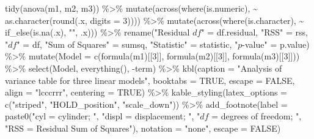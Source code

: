 \documentclass[
  11pt,
  a4paper,
  twoside]{scrbook}
\newenvironment{Shaded}{\begin{snugshade}}{\end{snugshade}}
\newcommand{\AttributeTok}[1]{\textcolor[rgb]{0.77,0.63,0.00}{#1}}
\newcommand{\ConstantTok}[1]{\textcolor[rgb]{0.00,0.00,0.00}{#1}}
\newcommand{\DecValTok}[1]{\textcolor[rgb]{0.00,0.00,0.81}{#1}}
\newcommand{\FunctionTok}[1]{\textcolor[rgb]{0.00,0.00,0.00}{#1}}
\newcommand{\NormalTok}[1]{#1}
\newcommand{\OtherTok}[1]{\textcolor[rgb]{0.56,0.35,0.01}{#1}}
\newcommand{\SpecialCharTok}[1]{\textcolor[rgb]{0.00,0.00,0.00}{#1}}
\newcommand{\StringTok}[1]{\textcolor[rgb]{0.31,0.60,0.02}{#1}}
\begin{document}
\begin{Shaded}
\begin{Highlighting}[]
\FunctionTok{tidy}\NormalTok{(}\FunctionTok{anova}\NormalTok{(m1, m2, m3)) }\SpecialCharTok{\%\textgreater{}\%} 
    \FunctionTok{mutate}\NormalTok{(}\FunctionTok{across}\NormalTok{(}\FunctionTok{where}\NormalTok{(is.numeric), }\SpecialCharTok{\textasciitilde{}} \FunctionTok{as.character}\NormalTok{(}\FunctionTok{round}\NormalTok{(.x, }\AttributeTok{digits =} \DecValTok{3}\NormalTok{)))) }\SpecialCharTok{\%\textgreater{}\%} 
    \FunctionTok{mutate}\NormalTok{(}\FunctionTok{across}\NormalTok{(}\FunctionTok{where}\NormalTok{(is.character), }\SpecialCharTok{\textasciitilde{}} \FunctionTok{if\_else}\NormalTok{(}\FunctionTok{is.na}\NormalTok{(.x), }\StringTok{""}\NormalTok{, .x))) }\SpecialCharTok{\%\textgreater{}\%} 
    \FunctionTok{rename}\NormalTok{(}\StringTok{"Residual $df$"} \OtherTok{=} \StringTok{\textasciigrave{}}\AttributeTok{df.residual}\StringTok{\textasciigrave{}}\NormalTok{,}
           \StringTok{"RSS"} \OtherTok{=}\NormalTok{ rss,}
           \StringTok{"$df$"} \OtherTok{=}\NormalTok{ df,}
           \StringTok{"Sum of Squares"} \OtherTok{=}\NormalTok{ sumsq,}
           \StringTok{"Statistic"} \OtherTok{=}\NormalTok{ statistic,}
           \StringTok{"$p${-}value"} \OtherTok{=}\NormalTok{ p.value) }\SpecialCharTok{\%\textgreater{}\%}
    \FunctionTok{mutate}\NormalTok{(}\AttributeTok{Model =} \FunctionTok{c}\NormalTok{(}\FunctionTok{formula}\NormalTok{(m1)[[}\DecValTok{3}\NormalTok{]], }\FunctionTok{formula}\NormalTok{(m2)[[}\DecValTok{3}\NormalTok{]], }\FunctionTok{formula}\NormalTok{(m3)[[}\DecValTok{3}\NormalTok{]])) }\SpecialCharTok{\%\textgreater{}\%} 
    \FunctionTok{select}\NormalTok{(Model, }\FunctionTok{everything}\NormalTok{(), }\SpecialCharTok{{-}}\NormalTok{term) }\SpecialCharTok{\%\textgreater{}\%} 
    \FunctionTok{kbl}\NormalTok{(}\AttributeTok{caption =} \StringTok{"Analysis of variance table for three linear models"}\NormalTok{,}
        \AttributeTok{booktabs =} \ConstantTok{TRUE}\NormalTok{, }\AttributeTok{escape =} \ConstantTok{FALSE}\NormalTok{, }\AttributeTok{align =} \StringTok{"lcccrrr"}\NormalTok{,}
        \AttributeTok{centering =} \ConstantTok{TRUE}\NormalTok{) }\SpecialCharTok{\%\textgreater{}\%} 
    \FunctionTok{kable\_styling}\NormalTok{(}\AttributeTok{latex\_options =} \FunctionTok{c}\NormalTok{(}\StringTok{"striped"}\NormalTok{, }\StringTok{"HOLD\_position"}\NormalTok{,}
                                    \StringTok{"scale\_down"}\NormalTok{)) }\SpecialCharTok{\%\textgreater{}\%} 
    \FunctionTok{add\_footnote}\NormalTok{(}\AttributeTok{label =} \FunctionTok{paste0}\NormalTok{(}\StringTok{"cyl = cylinder; "}\NormalTok{,}
                                \StringTok{"displ = displacement; "}\NormalTok{,}
                                \StringTok{"$df$ = degrees of freedom; "}\NormalTok{, }
                                \StringTok{"RSS = Residual Sum of Squares"}\NormalTok{),}
                 \AttributeTok{notation =} \StringTok{"none"}\NormalTok{, }\AttributeTok{escape =} \ConstantTok{FALSE}\NormalTok{) }
\end{Highlighting}
\end{Shaded}
\end{document}
